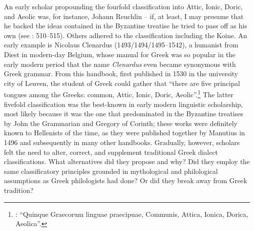 An early scholar propounding the fourfold classification into Attic, Ionic, Dor\-ic, and Aeolic was, for instance, Johann Reuchlin – if, at least, I may presume that he backed the ideas contained in the Byzantine treatise he tried to pass off as his own (see \citealt{VanRooy2014}: 510–515). Others adhered to the classification including the Koine. An early example is Nicolaus Clenardus (1493/1494/1495–1542), a humanist from Diest in modern-day Belgium, whose manual for Greek was so popular in the early modern period that the name \textit{Clenardus} even became synonymous with Greek grammar. From this handbook, first published in 1530 in the university city of Leuven, the student of Greek could gather that “there are five principal tongues among the Greeks: common, Attic, Ionic, Doric, Aeolic”.\footnote{\citet[7 (misprint for 6)]{Clenardus1530}: “Quinque Graecorum linguae praecipuae, Communis, Attica, Ionica, Dorica, Aeolica”.} The latter fivefold classification was the best-known in early modern linguistic scholarship, most likely because it was the one that predominated in the Byzantine treatises by John the Grammarian and Gregory of Corinth; these works were definitely known to Hellenists of the time, as they were published together by Manutius in 1496 and subsequently in many other handbooks. Gradually, however, scholars felt the need to alter, correct, and supplement traditional Greek dialect classifications. What alternatives did they propose and why? Did they employ the same classificatory principles grounded in mythological and philological assumptions as Greek philologists had done? Or did they break away from Greek tradition?

